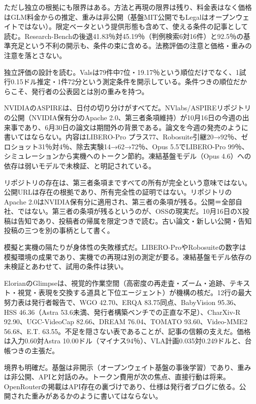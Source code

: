 \documentclass[lualatex,a4paper,10pt]{jlreq}
\begin{document}
ただし独立の根拠にも限界はある。方法と再現の限界は残り、料金表はなく価格はGLM料金からの推定、重みは非公開（基盤MIT公開でもLegalはオープンウェイトではない）。限定ベータという提供形態も含めて、使える条件の記事として読む。Research-Benchの後退41.83％対45.19％（判例検索6対16件）と92.5％の基準充足という不利の開示も、条件の束に含める。法務評価の注意と価格・重みの注意を落とさない。
\cite{B55,B53,B54}


独立評価の設計を読む。Valsは79件中7位・19.17％という順位だけでなく、1試行0.15ドル推定・1件72分という測定条件を開示している。条件つきの順位だからこそ、発行者の公表図とは別の重みを持つ。
\cite{B55,B53,B54}


NVIDIAのASPIREは、日付の切り分けがすべてだ。NVlabs/ASPIREリポジトリの公開（NVIDIA保有分のApache 2.0、第三者条項維持）が10月16日の今週の出来事であり、6月30日の論文は期間外の背景である。論文を今週の発売のように書いてはならない。内容はLIBERO-Pro プラス77、Robosuite引継20→92％、ゼロショット31％対4％、除去実験14→62→72％、Opus 5.5でLIBERO-Pro 99％、シミュレーションから実機へのトークン節約。凍結基盤モデル（Opus 4.6）への依存は弱いモデルで未検証、と明記されている。
\cite{B57,B56}


リポジトリの存在は、第三者条項まですべての所有が完全という意味ではない。公開URLは存在の根拠であり、所有完全性の証明ではない。リポジトリのApache 2.0はNVIDIA保有分に適用され、第三者の条項が残る。公開＝全部自社、ではない。第三者の条項が残るというのが、OSSの現実だ。10月16日のX投稿は告知であり、投稿者の帰属を限定つきで読む。古い論文・新しい公開・告知投稿の三つを別の事柄として書く。
\cite{B57,B56}


模擬と実機の隔たりが身体性の失敗様式だ。LIBERO-ProやRobosuiteの数字は模擬環境の成果であり、実機での再現は別の測定が要る。凍結基盤モデル依存の未検証とあわせて、試用の条件は狭い。
\cite{B57,B56}


ElorianのGlimpseは、視覚的作業空間（高密度の再走査・ズーム・追跡、テキスト・視覚・表現を交換する道具と下位エージェント）が機構の核だ。12行の最大努力表は発行者報告で、WGO 42.70、ERQA 83.75同点、BabyVision 95.36、HSS 46.36（Astra 53.6未満、発行者構築ベンチでの正直な不足）、CharXiv-R 92.90、UGC-VideoCap 82.66、DREAM 76.04、TOMATO 93.60、Video-MME2 56.68、E.T. 63.55。不足を隠さない表であることが、記事の信頼の支えだ。価格は入力0.60対Astra 10.00ドル（マイナス94％）、VLA計画0.035対0.249ドルと、台帳つきの主張だ。
\cite{B58,B59,B88}


境界も明確だ。基盤は非開示（オープンウェイト基盤の事後学習）であり、重みは非公開、APIと対話のみ。トークン費用が次の焦点、直接行動は将来。OpenRouterの掲載はAPI存在の裏づけであり、仕様は発行者ブログに依る。公開された重みがあるかのように書いてはならない。
\cite{B58,B59,B88}
\end{document}

